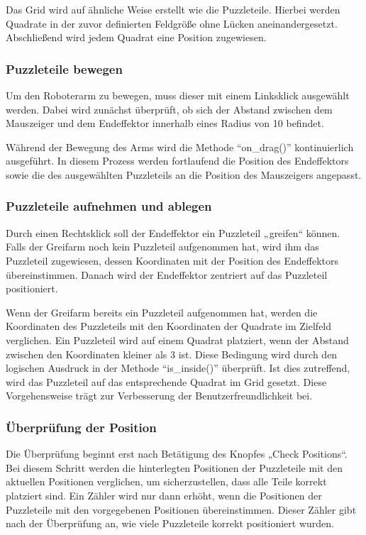 \documentclass[12pt]{article}
\begin{document}
    
                Das Grid wird auf ähnliche Weise erstellt wie die Puzzleteile. Hierbei werden Quadrate in der zuvor
                definierten Feldgröße ohne Lücken aneinandergesetzt. Abschließend wird jedem Quadrat eine Position
                zugewiesen.
    
            \subsubsection{Puzzleteile bewegen}
                Um den Roboterarm zu bewegen, muss dieser mit einem Linksklick ausgewählt werden. Dabei wird zunächst
                überprüft, ob sich der Abstand zwischen dem Mauszeiger und dem Endeffektor innerhalb eines Radius
                von 10 befindet.

                Während der Bewegung des Arms wird die Methode “on\_drag()” kontinuierlich ausgeführt. In diesem
                Prozess werden fortlaufend die Position des Endeffektors sowie die des ausgewählten Puzzleteils an
                die Position des Mauszeigers angepasst.

            \subsubsection{Puzzleteile aufnehmen und ablegen}
                Durch einen Rechtsklick soll der Endeffektor ein Puzzleteil „greifen“ können. Falls der Greifarm noch
                kein Puzzleteil aufgenommen hat, wird ihm das Puzzleteil zugewiesen, dessen Koordinaten mit der
                Position des Endeffektors übereinstimmen. Danach wird der Endeffektor zentriert auf das Puzzleteil
                positioniert.

                Wenn der Greifarm bereits ein Puzzleteil aufgenommen hat, werden die Koordinaten des Puzzleteils mit 
                den Koordinaten der Quadrate im Zielfeld verglichen. Ein Puzzleteil wird auf einem Quadrat platziert,
                wenn der Abstand zwischen den Koordinaten kleiner als 3 ist. Diese Bedingung wird durch den logischen 
                Ausdruck in der Methode “is\_inside()” überprüft. Ist dies zutreffend, wird das Puzzleteil auf das
                entsprechende Quadrat im Grid gesetzt. Diese Vorgehensweise trägt zur Verbesserung der
                Benutzerfreundlichkeit bei.
    
            \subsubsection{Überprüfung der Position}
                Die Überprüfung beginnt erst nach Betätigung des Knopfes „Check Positions“. Bei diesem Schritt
                werden die hinterlegten Positionen der Puzzleteile mit den aktuellen Positionen verglichen, um
                sicherzustellen, dass alle Teile korrekt platziert sind. Ein Zähler wird nur dann erhöht, wenn die
                Positionen der Puzzleteile mit den vorgegebenen Positionen übereinstimmen. Dieser Zähler gibt nach
                der Überprüfung an, wie viele Puzzleteile korrekt positioniert wurden.
\end{document}
